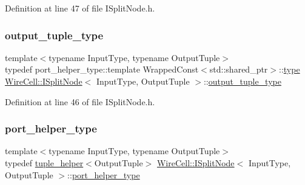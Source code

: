 Definition at line 47 of file I\+Split\+Node.\+h.

\mbox{\label{class_wire_cell_1_1_i_split_node_acd382a6b5a9c3f322943ce2dd66fa7f4}} 
\subsubsection{\texorpdfstring{output\+\_\+tuple\+\_\+type}{output\_tuple\_type}}
{\footnotesize\ttfamily template$<$typename Input\+Type, typename Output\+Tuple$>$ \\
typedef port\+\_\+helper\+\_\+type\+::template Wrapped\+Const$<$std\+::shared\+\_\+ptr$>$\+::\hyperlink{namespace_wire_cell_a1f69a2598e2cdb413ffac1157b50670a}{type} \hyperlink{class_wire_cell_1_1_i_split_node}{Wire\+Cell\+::\+I\+Split\+Node}$<$ Input\+Type, Output\+Tuple $>$\+::\hyperlink{class_wire_cell_1_1_i_split_node_acd382a6b5a9c3f322943ce2dd66fa7f4}{output\+\_\+tuple\+\_\+type}}



Definition at line 46 of file I\+Split\+Node.\+h.

\mbox{\label{class_wire_cell_1_1_i_split_node_a1ac35da3c288620eadd7276c9772fa28}} 
\subsubsection{\texorpdfstring{port\+\_\+helper\+\_\+type}{port\_helper\_type}}
{\footnotesize\ttfamily template$<$typename Input\+Type, typename Output\+Tuple$>$ \\
typedef \hyperlink{struct_wire_cell_1_1tuple__helper}{tuple\+\_\+helper}$<$Output\+Tuple$>$ \hyperlink{class_wire_cell_1_1_i_split_node}{Wire\+Cell\+::\+I\+Split\+Node}$<$ Input\+Type, Output\+Tuple $>$\+::\hyperlink{class_wire_cell_1_1_i_split_node_a1ac35da3c288620eadd7276c9772fa28}{port\+\_\+helper\+\_\+type}}



